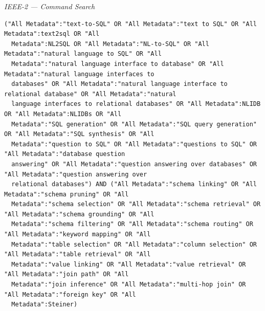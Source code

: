 \par\medskip\noindent\textit{IEEE-2 — Command Search}\par\nopagebreak
\begin{lstlisting}
("All Metadata":"text-to-SQL" OR "All Metadata":"text to SQL" OR "All Metadata":text2sql OR "All
  Metadata":NL2SQL OR "All Metadata":"NL-to-SQL" OR "All Metadata":"natural language to SQL" OR "All
  Metadata":"natural language interface to database" OR "All Metadata":"natural language interfaces to
  databases" OR "All Metadata":"natural language interface to relational database" OR "All Metadata":"natural
  language interfaces to relational databases" OR "All Metadata":NLIDB OR "All Metadata":NLIDBs OR "All
  Metadata":"SQL generation" OR "All Metadata":"SQL query generation" OR "All Metadata":"SQL synthesis" OR "All
  Metadata":"question to SQL" OR "All Metadata":"questions to SQL" OR "All Metadata":"database question
  answering" OR "All Metadata":"question answering over databases" OR "All Metadata":"question answering over
  relational databases") AND ("All Metadata":"schema linking" OR "All Metadata":"schema pruning" OR "All
  Metadata":"schema selection" OR "All Metadata":"schema retrieval" OR "All Metadata":"schema grounding" OR "All
  Metadata":"schema filtering" OR "All Metadata":"schema routing" OR "All Metadata":"keyword mapping" OR "All
  Metadata":"table selection" OR "All Metadata":"column selection" OR "All Metadata":"table retrieval" OR "All
  Metadata":"value linking" OR "All Metadata":"value retrieval" OR "All Metadata":"join path" OR "All
  Metadata":"join inference" OR "All Metadata":"multi-hop join" OR "All Metadata":"foreign key" OR "All
  Metadata":Steiner)
\end{lstlisting}


